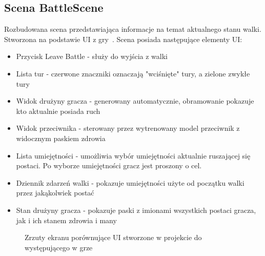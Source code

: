 \documentclass{SGGW-thesis}
\begin{document}
\subsection{Scena BattleScene}
Rozbudowana scena przedstawiająca informacje na temat aktualnego stanu walki. Stworzona na podstawie UI z gry~\cite{SMT3}.
Scena posiada następujące elementy UI:
\begin{itemize}
  \item{Przycisk Leave Battle - służy do wyjścia z walki}
  \item{Lista tur - czerwone znaczniki oznaczają "wciśnięte" tury, a zielone zwykłe tury}
  \item{Widok drużyny gracza - generowany automatycznie, obramowanie pokazuje kto aktualnie posiada ruch}
  \item{Widok przeciwnika - sterowany przez wytrenowany model przeciwnik z widocznym paskiem zdrowia}
  \item{Lista umiejętności - umożliwia wybór umiejętności aktualnie ruszającej się postaci. Po wyborze umiejętności gracz jest proszony o cel.}
  \item{Dziennik zdarzeń walki - pokazuje umiejętności użyte od początku walki przez jakąkolwiek postać}
  \item{Stan drużyny gracza - pokazuje paski z imionami wszystkich postaci gracza, jak i ich stanem zdrowia i many}
\end{itemize}
\begin{figure}[H]
  \hfill
  \hfill
  \hfill
  \caption{Zrzuty ekranu porównujące UI stworzone w projekcie do występującego w grze \cite{SMT3}}
\end{figure}
\pagebreak
\end{document}
